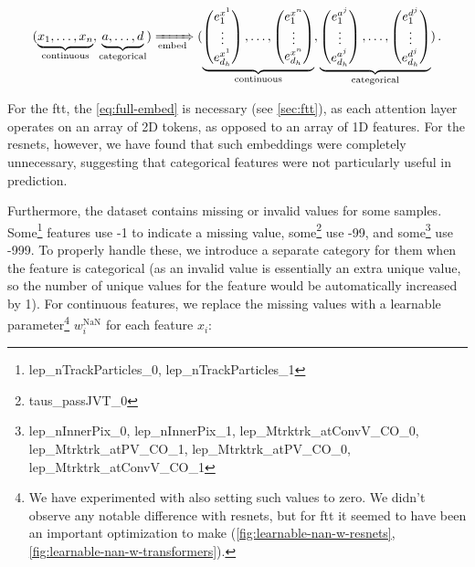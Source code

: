 \begin{equation}
    \label{eq:full-embed}
    (\underbrace{x_1, \dots, x_n}_\text{continuous},
    \underbrace{a, \dots, d}_\text{categorical})
    \xRightarrow[\text{embed}]{}
    (\underbrace{\begin{pmatrix}
            e^{x^1}_1 \\ \vdots \\ e^{x^1}_{d_h}
        \end{pmatrix}, \dots,
        \begin{pmatrix}
            e^{x^n}_1 \\ \vdots \\ e^{x^n}_{d_h}
        \end{pmatrix}}_\text{continuous},
    \underbrace{\begin{pmatrix}
            e^{a^j}_1 \\ \vdots \\ e^{a^j}_{d_h}
        \end{pmatrix}, \dots,
        \begin{pmatrix}
            e^{d^j}_1 \\ \vdots \\ e^{d^j}_{d_h}
        \end{pmatrix}}_\text{categorical})\,.
\end{equation}

For the \gls{ftt}, the \autoref{eq:full-embed} is necessary (see \autoref{sec:ftt}), as each attention layer operates
on an array of 2D tokens, as opposed to an array of 1D features. For the \glspl{resnet}, however, we have found that
such embeddings were completely unnecessary, suggesting that categorical features were not particularly useful in
prediction.

Furthermore, the dataset contains missing or invalid values for some samples.  Some\footnote{lep\_nTrackParticles\_0,
    lep\_nTrackParticles\_1} features use -1 to indicate a missing value, some\footnote{taus\_passJVT\_0} use -99, and
some\footnote{lep\_nInnerPix\_0, lep\_nInnerPix\_1, lep\_Mtrktrk\_atConvV\_CO\_0, lep\_Mtrktrk\_atPV\_CO\_1,
    lep\_Mtrktrk\_atPV\_CO\_0, lep\_Mtrktrk\_atConvV\_CO\_1} use -999. To properly handle these, we introduce a separate
category for them when the feature is categorical (as an invalid value is essentially an extra unique value, so the
number of unique values for the feature would be automatically increased by 1). For continuous features, we replace the
missing values with a learnable parameter\footnote{We have experimented with also setting such values to zero. We didn't
    observe any notable difference with \glspl{resnet}, but for \gls{ftt} it seemed to have been an important
    optimization to make (\autoref{fig:learnable-nan-w-resnets}, \autoref{fig:learnable-nan-w-transformers}).}
$w^\text{NaN}_i$ for each feature $x_i$:

